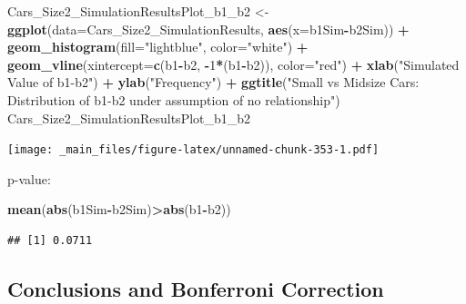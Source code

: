 \documentclass[]{book}
\newenvironment{Shaded}{\begin{snugshade}}{\end{snugshade}}
\newcommand{\KeywordTok}[1]{\textcolor[rgb]{0.13,0.29,0.53}{\textbf{#1}}}
\newcommand{\DataTypeTok}[1]{\textcolor[rgb]{0.13,0.29,0.53}{#1}}
\newcommand{\DecValTok}[1]{\textcolor[rgb]{0.00,0.00,0.81}{#1}}
\newcommand{\StringTok}[1]{\textcolor[rgb]{0.31,0.60,0.02}{#1}}
\newcommand{\OperatorTok}[1]{\textcolor[rgb]{0.81,0.36,0.00}{\textbf{#1}}}
\newcommand{\NormalTok}[1]{#1}
\begin{document}
\begin{Shaded}
\begin{Highlighting}[]
\NormalTok{Cars_Size2_SimulationResultsPlot_b1_b2 <-}\StringTok{ }\KeywordTok{ggplot}\NormalTok{(}\DataTypeTok{data=}\NormalTok{Cars_Size2_SimulationResults, }\KeywordTok{aes}\NormalTok{(}\DataTypeTok{x=}\NormalTok{b1Sim}\OperatorTok{-}\NormalTok{b2Sim)) }\OperatorTok{+}\StringTok{ }
\StringTok{  }\KeywordTok{geom_histogram}\NormalTok{(}\DataTypeTok{fill=}\StringTok{"lightblue"}\NormalTok{, }\DataTypeTok{color=}\StringTok{"white"}\NormalTok{) }\OperatorTok{+}\StringTok{ }\KeywordTok{geom_vline}\NormalTok{(}\DataTypeTok{xintercept=}\KeywordTok{c}\NormalTok{(b1}\OperatorTok{-}\NormalTok{b2, }\OperatorTok{-}\DecValTok{1}\OperatorTok{*}\NormalTok{(b1}\OperatorTok{-}\NormalTok{b2)), }\DataTypeTok{color=}\StringTok{"red"}\NormalTok{) }\OperatorTok{+}\StringTok{ }
\StringTok{  }\KeywordTok{xlab}\NormalTok{(}\StringTok{"Simulated Value of b1-b2"}\NormalTok{) }\OperatorTok{+}\StringTok{ }\KeywordTok{ylab}\NormalTok{(}\StringTok{"Frequency"}\NormalTok{) }\OperatorTok{+}\StringTok{ }
\StringTok{  }\KeywordTok{ggtitle}\NormalTok{(}\StringTok{"Small vs Midsize Cars: Distribution of b1-b2 under assumption of no relationship"}\NormalTok{)}
\NormalTok{Cars_Size2_SimulationResultsPlot_b1_b2}
\end{Highlighting}
\end{Shaded}

\texttt{[image: \_main\_files/figure-latex/unnamed-chunk-353-1.pdf]}

p-value:

\begin{Shaded}
\begin{Highlighting}[]
\KeywordTok{mean}\NormalTok{(}\KeywordTok{abs}\NormalTok{(b1Sim}\OperatorTok{-}\NormalTok{b2Sim)}\OperatorTok{>}\KeywordTok{abs}\NormalTok{(b1}\OperatorTok{-}\NormalTok{b2))}
\end{Highlighting}
\end{Shaded}

\begin{verbatim}
## [1] 0.0711
\end{verbatim}

\subsection{Conclusions and Bonferroni
Correction}\label{conclusions-and-bonferroni-correction}
\end{document}
